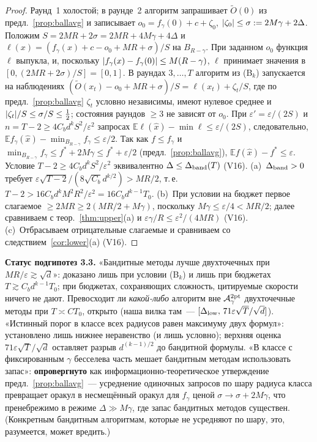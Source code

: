 \documentclass[11pt,a4paper]{article}
\numberwithin{equation}{section}
\theoremstyle{definition}
\theoremstyle{remark}
\newcommand{\E}{\mathbb E}\newcommand{\R}{\mathbb R}\newcommand{\Z}{\mathbb Z}\let\Prob\relax\newcommand{\Prob}{\mathbb P}
\begin{document}
\begin{proof}
Раунд~1 холостой; в раунде~2 алгоритм запрашивает $\tilde O(0)$ из предл.~\ref{prop:ballavg} и записывает $o_0=f_\gamma(0)+c+\zeta_0$, $\lvert \zeta_0\rvert\le\sigma:=2M\gamma+2\Delta$. Положим $S=2MR+2\sigma=2MR+4M\gamma+4\Delta$ и $\ell(x)=(f_\gamma(x)+c-o_0+MR+\sigma)/S$ на $B_{R-\gamma}$. При заданном $o_0$ функция $\ell$ выпукла, и, поскольку $\lvert f_\gamma(x)-f_\gamma(0)\rvert\le M(R-\gamma)$, $\ell$ принимает значения в $[0,(2MR+2\sigma)/S]=[0,1]$. В раундах $3,\dots,T$ алгоритм из (B$_k$) запускается на наблюдениях $(\tilde O(x_t)-o_0+MR+\sigma)/S=\ell(x_t)+\zeta_t/S$, где по предл.~\ref{prop:ballavg} $\zeta_t$ условно независимы, имеют нулевое среднее и $\lvert \zeta_t\rvert/S\le\sigma/S\le\frac12$; состояния раундов $\ge3$ не зависят от $o_0$. При $\varepsilon'=\varepsilon/(2S)$ и $n=T-2\ge4C_bd^kS^2/\varepsilon^2$ запросах $\E\ell(\hat x)-\min\ell\le\varepsilon/(2S)$, следовательно, $\E f_\gamma(\hat x)-\min_{B_{R-\gamma}}f_\gamma\le\varepsilon/2$. Так как $f\le f_\gamma$ и $\min_{B_{R-\gamma}}f_\gamma\le f^*+2M\gamma\le f^*+\varepsilon/2$ (предл.~\ref{prop:ballavg}), $\E f(\hat x)-f^*\le\varepsilon$. Условие $T-2\ge4C_bd^kS^2/\varepsilon^2$ эквивалентно $\Delta\le\Delta_{\rm band}(T)$ (V16). (a)~$\Delta_{\rm band}>0$ требует $\varepsilon\sqrt{T-2}/(8\sqrt{C_b}d^{k/2})>MR/2$, т.\,е.\ $T-2>16C_bd^kM^2R^2/\varepsilon^2=16C_bd^{k-1}T_0$. (b)~При условии на бюджет первое слагаемое $\ge2MR\ge2(MR/2+M\gamma)$, поскольку $M\gamma\le\varepsilon/4<MR/2$; далее сравниваем с теор.~\ref{thm:upper}(a) и $\varepsilon\gamma/R\le\varepsilon^2/(4MR)$ (V16). (c)~Отбрасываем отрицательные слагаемые и сравниваем со следствием~\ref{cor:lower}(a) (V16).
\end{proof}
\noindent\textbf{Статус подгипотез 3.3.} «Бандитные методы лучше двухточечных при $MR/\varepsilon\gtrsim\sqrt d$»: доказано лишь при условии (B$_k$) и лишь при бюджетах $T\gtrsim C_bd^{k-1}T_0$; при бюджетах, сохраняющих сложность, цитируемые скорости ничего не дают. Превосходит ли \emph{какой-либо} алгоритм вне $\mathcal A^{\rm 2pt}_\gamma$ двухточечные методы при $T\asymp CT_0$, открыто (наша вилка там~--- $[\Delta_{\rm low},\,71\varepsilon\sqrt T/\sqrt d]$). «Истинный порог в классе всех радиусов равен максимуму двух формул»: установлено лишь нижнее неравенство (и лишь условно); верхняя оценка $71\varepsilon\sqrt T/\sqrt d$ оставляет разрыв $d^{(k-1)/2}$ до бандитной формулы. «В классе с фиксированным $\gamma$ бесселева часть мешает бандитным методам использовать запас»: \textbf{опровергнуто} как информационно-теоретическое утверждение предл.~\ref{prop:ballavg}~--- усреднение одиночных запросов по шару радиуса класса превращает оракул в несмещённый оракул для $f_\gamma$ ценой $\sigma\to\sigma+2M\gamma$, что пренебрежимо в режиме $\Delta\gg M\gamma$, где запас бандитных методов существен. (Конкретным бандитным алгоритмам, которые не усредняют по шару, это, разумеется, может вредить.)
\end{document}
